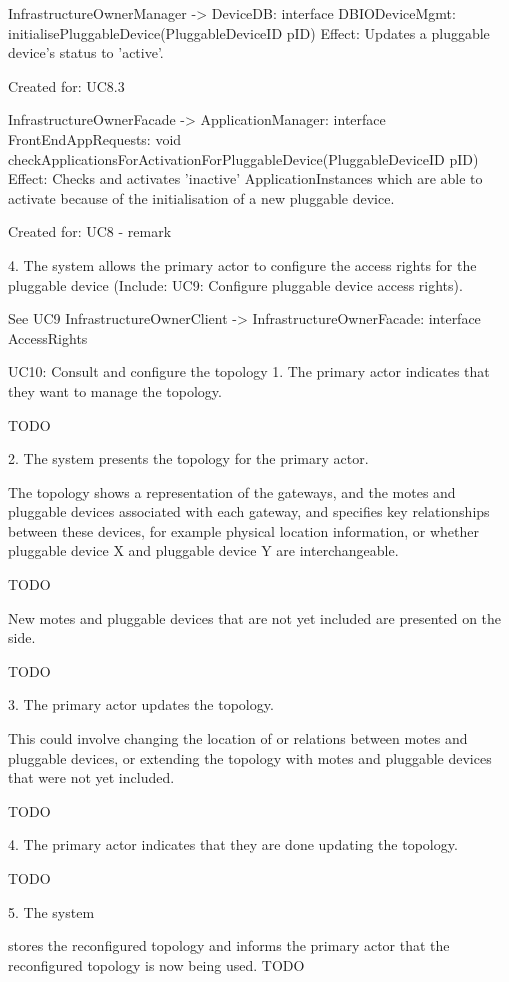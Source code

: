 {{{            InfrastructureOwnerManager -> DeviceDB: interface DBIODeviceMgmt: initialisePluggableDevice(PluggableDeviceID pID)
                Effect: Updates a pluggable device's status to 'active'.
                \item Created for: UC8.3

            InfrastructureOwnerFacade -> ApplicationManager: interface FrontEndAppRequests: void checkApplicationsForActivationForPluggableDevice(PluggableDeviceID pID)
                Effect: Checks and activates 'inactive' ApplicationInstances which are able to activate because of the initialisation of a new pluggable device.
                \item Created for: UC8 - remark

        4. The system allows the primary actor to configure the access rights for the pluggable device (Include: UC9: Configure pluggable device access rights).

            See UC9
            InfrastructureOwnerClient -> InfrastructureOwnerFacade: interface AccessRights

    UC10: Consult and configure the topology
        1. The primary actor indicates that they want to manage the topology.

            TODO

        2. The system presents the topology for the primary actor.
           { The topology shows a representation of the gateways, and the motes and pluggable devices associated with each gateway,
           and specifies key relationships between these devices, for example physical location information,
           or whether pluggable device X and pluggable device Y are interchangeable.

            TODO

           { New motes and pluggable devices that are not yet included are presented on the side.

            TODO

        3. The primary actor updates the topology.
           { This could involve changing the location of or relations between motes and pluggable devices,
           or extending the topology with motes and pluggable devices that were not yet included.

            TODO

        4. The primary actor indicates that they are done updating the topology.

            TODO

        5. The system
           { stores the reconfigured topology and informs the primary actor that the reconfigured topology is now being used.
            TODO

}}}}}}}
